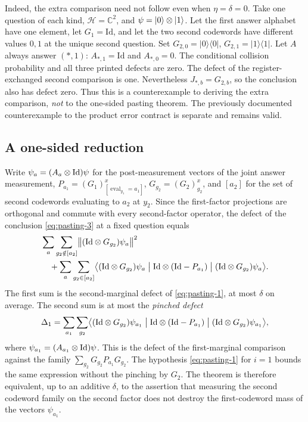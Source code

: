 \documentclass[11pt]{article}
\begin{document}
Indeed, the extra comparison need not follow even when $\eta=\delta=0$.
Take one question of each kind, $\mathcal H=\mathbb C^2$, and
$\psi=|0\rangle\otimes|1\rangle$. Let the first answer alphabet have one element,
let $G_1=\mathrm{Id}$, and let the two second codewords have different values
$0,1$ at the unique second question. Set $G_{2,0}=|0\rangle\langle0|$,
$G_{2,1}=|1\rangle\langle1|$. Let $A$ always answer $(\ast,1)$:
$A_{\ast,1}=\mathrm{Id}$ and $A_{\ast,0}=0$.
The conditional collision probability and all three printed defects are zero.
The defect of the register-exchanged second comparison is one. Nevertheless
$J_{\ast,b}=G_{2,b}$, so the conclusion also has defect zero. Thus this is a
counterexample to deriving the extra comparison, \emph{not} to the one-sided
pasting theorem. The previously documented counterexample to the product
error contract is separate and remains valid.

\subsection*{A one-sided reduction}

Write $\psi_a=(A_a\otimes\mathrm{Id})\psi$ for the post-measurement vectors of the
joint answer measurement, $P_{a_1}=(G_1)^x_{[\operatorname{eval}_{y_1}=a_1]}$,
$G_{g_2}=(G_2)^x_{g_2}$, and $[a_2]$ for the set of second codewords
evaluating to $a_2$ at $y_2$.  Since the first-factor projections are
orthogonal and commute with every second-factor operator, the defect of the
conclusion \eqref{eq:pasting-3} at a fixed question equals
\[
 \begin{aligned}
  &\sum_a\sum_{g_2\notin[a_2]}
    \bigl\|(\mathrm{Id}\otimes G_{g_2})\psi_a\bigr\|^2\\
  &\quad+\sum_a\sum_{g_2\in[a_2]}
    \bigl\langle(\mathrm{Id}\otimes G_{g_2})\psi_a\bigm|
      \mathrm{Id}\otimes(\mathrm{Id}-P_{a_1})\bigm|
      (\mathrm{Id}\otimes G_{g_2})\psi_a\bigr\rangle .
 \end{aligned}
\]
The first sum is the second-marginal defect of \eqref{eq:pasting-1}, at most
$\delta$ on average.  The second sum is at most the \emph{pinched defect}
\[
  \Delta_1=\sum_{a_1}\sum_{g_2}
    \bigl\langle(\mathrm{Id}\otimes G_{g_2})\psi_{a_1}\bigm|
      \mathrm{Id}\otimes(\mathrm{Id}-P_{a_1})\bigm|
      (\mathrm{Id}\otimes G_{g_2})\psi_{a_1}\bigr\rangle,
\]
where $\psi_{a_1}=(A_{a_1}\otimes\mathrm{Id})\psi$. This is the defect of the
first-marginal comparison against the family
$\sum_{g_2}G_{g_2}P_{a_1}G_{g_2}$.  The hypothesis \eqref{eq:pasting-1} for
$i=1$ bounds the same expression without the pinching by $G_2$.  The theorem
is therefore equivalent, up to an additive $\delta$, to the assertion that
measuring the second codeword family on the second factor does not destroy the
first-codeword mass of the vectors $\psi_{a_1}$.
\end{document}

